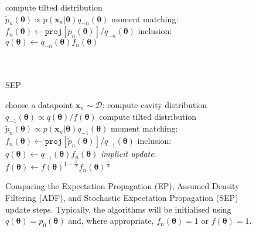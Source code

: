 \begin{figure}[!t]
\begin{minipage}[t]{0.33\linewidth}
\begin{algorithm}[H]
\begin{algorithmic}[1]
	\STATE compute tilted distribution \\$\tilde{p}_n(\bm{\theta}) \propto p(\bm{x}_n|\bm{\theta}) q_{-n}(\bm{\theta})$
	\STATE moment matching: \\ \hspace{-1mm}$f_n(\bm{\theta}) \leftarrow \mathtt{proj}[\tilde{p}_n(\bm{\theta})] / q_{-n}(\bm{\theta}) $
	\STATE inclusion:\\ $q(\bm{\theta}) \leftarrow q_{-n}(\bm{\theta}) f_n(\bm{\theta})$\\\hspace{1mm}\\ \vspace{1.5mm} \hspace{1mm}\\
\end{algorithmic}
\end{algorithm}
\end{minipage}
\begin{minipage}[t]{0.33\linewidth}
\centering
\begin{algorithm}[H]
\caption{SEP} \small
\label{alg:sep} 
\begin{algorithmic}[1] 
	\STATE choose a datapoint $\bm{x}_n\sim \mathcal{D}$:
	\STATE compute cavity distribution \\ $q_{-1}(\bm{\theta}) \propto q(\bm{\theta}) / f(\bm{\theta})$
	\STATE compute tilted distribution \\$\tilde{p}_n(\bm{\theta}) \propto p(\bm{x}_n|\bm{\theta}) q_{-1}(\bm{\theta})$
	\STATE moment matching: \\\hspace{-1mm}$f_n(\bm{\theta}) \leftarrow \mathtt{proj}[\tilde{p}_n(\bm{\theta})] / q_{-1}(\bm{\theta}) $
	\STATE inclusion:\\ $q(\bm{\theta}) \leftarrow q_{-1}(\bm{\theta}) f_n(\bm{\theta})$
	\STATE \textit{implicit update}:\\ $f(\bm{\theta}) \leftarrow f(\bm{\theta})^{1 - \frac{1}{N}} f_n(\bm{\theta})^{\frac{1}{N}}$
\end{algorithmic}
\end{algorithm}
\end{minipage} 
%
\caption{Comparing the Expectation Propagation (EP), Assumed Density Filtering (ADF), and Stochastic Expectation Propagation (SEP) update steps. Typically, the algorithms will be initialised using $q(\bm{\theta}) = p_0(\bm{\theta})$ and, where appropriate, $f_n(\bm{\theta})=1$ or $f(\bm{\theta})=1$.}
\end{figure}

